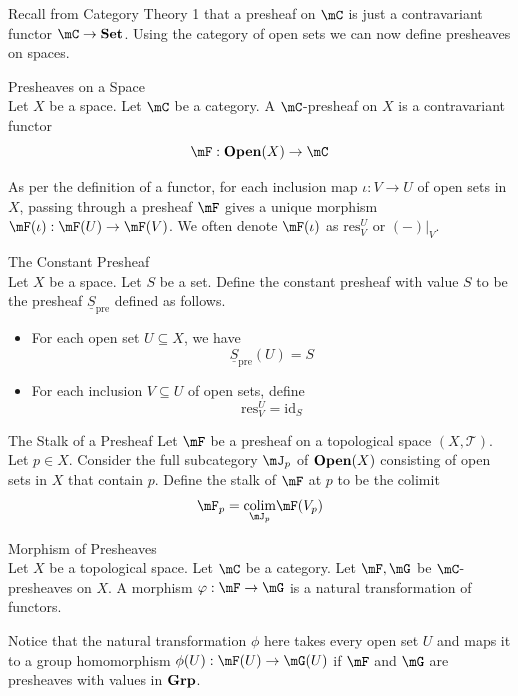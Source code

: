 \documentclass[a4paper]{article}
\begin{document}
Recall from Category Theory 1 that a presheaf on $\mC$ is just a contravariant functor $\mC\to\bold{Set}$. Using the category of open sets we can now define presheaves on spaces. 

\begin{defn}{Presheaves on a Space}{}\\
Let $X$ be a space. Let $\mC$ be a category. A $\mC$-presheaf on $X$ is a contravariant functor $$\mF:\bold{Open}(X)\to\mC$$
\end{defn}

As per the definition of a functor, for each inclusion map $\iota:V\to U$ of open sets in $X$, passing through a presheaf $\mF$ gives a unique morphism $\mF(\iota):\mF(U)\to\mF(V)$. We often denote $\mF(\iota)$ as $\text{res}_V^U$ or $(-)|_V$. 

\begin{eg}{The Constant Presheaf}{}\\
Let $X$ be a space. Let $S$ be a set. Define the constant presheaf with value $S$ to be the presheaf $\underline{S}_\text{pre}$ defined as follows. 
\begin{itemize}
\item For each open set $U\subseteq X$, we have $$\underline{S}_\text{pre}(U)=S$$
\item For each inclusion $V\subseteq U$ of open sets, define $$\text{res}_V^U=\text{id}_S$$
\end{itemize}
\end{eg}

\begin{defn}{The Stalk of a Presheaf}{} Let $\mF$ be a presheaf on a topological space $(X,\mathcal{T})$. Let $p\in X$. Consider the full subcategory $\mJ_p$ of $\bold{Open}(X)$ consisting of open sets in $X$ that contain $p$. Define the stalk of $\mF$ at $p$ to be the colimit $$\mF_p=\underset{\mJ_p}{\text{colim}}\mF(V_p)$$ 
\end{defn}

\begin{defn}{Morphism of Presheaves}{}\\
Let $X$ be a topological space. Let $\mC$ be a category. Let $\mF,\mG$ be $\mC$-presheaves on $X$. A morphism $\varphi:\mF\to\mG$ is a natural transformation of functors. 
\end{defn}

Notice that the natural transformation $\phi$ here takes every open set $U$ and maps it to a group homomorphism $\phi(U):\mF(U)\to\mG(U)$ if $\mF$ and $\mG$ are presheaves with values in $\bold{Grp}$. 
\end{document}
